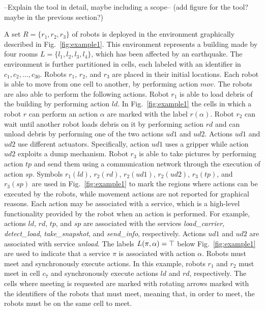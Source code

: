 --Explain the tool in detail, maybe including a scope-- (add figure for the tool? maybe in the previous section?) 

A set $R=\{r_1, r_2, r_3 \}$ of robots  is deployed in the environment graphically described in  Fig.~\ref{fig:example1}.
This environment represents a building made by four rooms $L=\{ l_1, l_2, l_3, l_4 \}$, which has been affected by an earthquake.
The environment is further partitioned in cells, each labeled with an identifier in $c_1, c_2, \ldots, c_{30}$.
Robots $r_1$, $r_2$, and $r_3$ are placed in their initial locations.
Each robot is able to move from one cell to another, by performing action $mov$.
The robots are also able to perform the following actions.
Robot $r_1$ is able to load debris of the building by performing action $ld$. 
In Fig.~\ref{fig:example1} the cells in which a robot $r$ can perform an action $\alpha$ are marked with the label $r(\alpha)$.
Robot $r_2$ can wait until another robot loads debris on it by performing action $rd$ and can unload debris by performing one of the two actions $ud1$ and $ud2$. 
Actions $ud1$ and $ud2$ use different actuators.
Specifically, action $ud1$ uses a gripper while action $ud2$ exploits a dump mechanism.
Robot $r_3$ is able to take pictures by performing action $tp$ and send them using a communication network through the execution of action $sp$. 
Symbols $r_1(ld)$, $r_2(rd)$, $r_2(ud1)$, $r_2(ud2)$, $r_3(tp)$, and $r_3(sp)$ are used in Fig.~\ref{fig:example1} to mark the regions where  actions can be executed by the robots, while movement actions are not reported for graphical reasons.
Each action may be associated with a service, which is a high-level functionality provided by the robot when an action is performed.
For example, actions $ld$, $rd$, $tp$, and $sp$  are associated with the services \emph{load\_carrier}, \emph{detect\_load}, \emph{take\_snapshot}, and \emph{send\_info}, respectively.
Actions $ud1$ and $ud2$ are associated with service \emph{unload}.
The labels $L(\pi,\alpha)=\top$ below Fig.~\ref{fig:example1} are used to indicate that a service $\pi$ is associated with  action $\alpha$. 
Robots must meet and  synchronously execute actions. 
In this example, robots $r_1$ and  $r_2$ must meet  in cell $c_7$ and synchronously execute actions $ld$ and $rd$, respectively. 
The cells where meeting is requested are marked with rotating arrows marked with the identifiers of the robots that must meet, meaning that, in order to meet, the robots must be on the same cell to meet.


